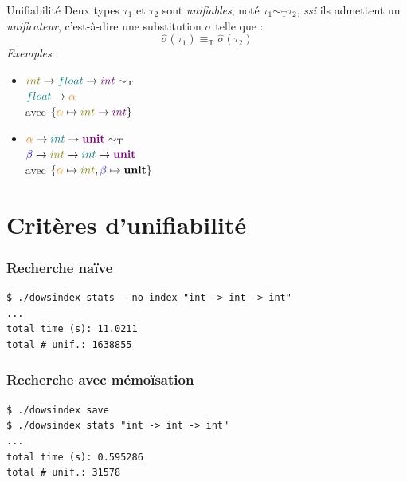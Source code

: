 \documentclass[serif]{beamer}
\newcommand{\exemples}{\textit{Exemples}\xspace}
\newcommand{\ssi}{\textit{ssi}\xspace}
\newcommand{\unit}{\bold{unit}}
\newcommand{\T}{\mathrm{T}}
\begin{document}

\begin{frame}{Unifiabilité}
\small
Deux types $\tau_1$ et $\tau_2$ sont \emph{unifiables}, noté $\tau_1 \sim_\T \tau_2$, \ssi ils admettent un \emph{unificateur}, c'est-à-dire une substitution $\sigma$ telle que :
\[ \hat\sigma (\tau_1) \equiv_\T \hat\sigma (\tau_2) \]
\exemples :
\begin{itemize}
	\item
		$\textcolor{olive}{int} \rightarrow \textcolor{teal}{float} \rightarrow \textcolor{violet}{int} \sim_\T$ \\
		$\textcolor{teal}{float} \rightarrow \textcolor{orange}{\alpha}$ \\
		avec $\{ \textcolor{orange}{\alpha} \mapsto \textcolor{olive}{int} \rightarrow \textcolor{violet}{int} \}$
	\item
		$\textcolor{orange}{\alpha} \rightarrow \textcolor{teal}{int} \rightarrow \textcolor{violet}{\unit} \sim_\T$ \\
		$\textcolor{blue}{\beta} \rightarrow \textcolor{olive}{int} \rightarrow \textcolor{teal}{int} \rightarrow \textcolor{violet}{\unit}$ \\
		avec $\{ \textcolor{orange}{\alpha} \mapsto \textcolor{olive}{int}, \textcolor{blue}{\beta} \mapsto \unit \}$
\end{itemize}
\end{frame}


\section{Critères d'unifiabilité}


\begin{frame}[fragile=singleslide]\frametitle{Recherche naïve}
\begin{verbatim}
$ ./dowsindex stats --no-index "int -> int -> int"
...
total time (s): 11.0211
total # unif.: 1638855
\end{verbatim}
\end{frame}


\begin{frame}[fragile=singleslide]\frametitle{Recherche avec mémoïsation}
\begin{verbatim}
$ ./dowsindex save
$ ./dowsindex stats "int -> int -> int"
...
total time (s): 0.595286
total # unif.: 31578
\end{verbatim}
\end{frame}
\end{document}
